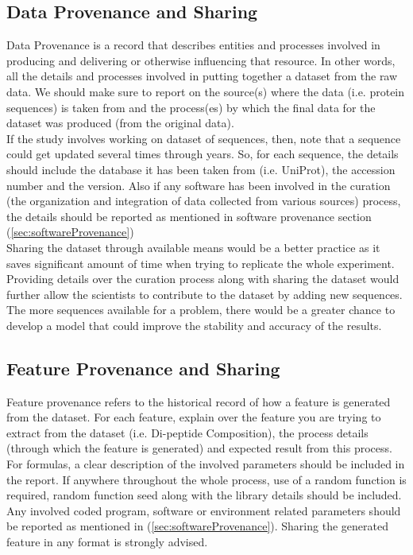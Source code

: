 \subsection{Data Provenance and Sharing}


    Data Provenance is a record that describes entities and processes involved in producing and delivering or otherwise influencing 
    that resource.\cite{w3c}  In other words, all the details and processes involved in putting together a dataset from the raw data. 
    We should make sure to report on the source(s) where the data (i.e. protein sequences) is taken from and the process(es) 
    by which the final data for the dataset was produced (from the original data). \\
    
    If the study involves working on dataset of sequences, then, note that a sequence could get updated several times through years. 
    So, for each sequence, the details should include the database it has been taken from (i.e. UniProt), 
    the accession number and the version. Also if any software has been involved in the curation
    (the organization and integration of data collected from various sources) process, 
    the details should be reported as mentioned in software provenance section (\ref{sec:softwareProvenance})\\
    
    
    Sharing the dataset through available means would be a better practice as it saves significant amount of time when
    trying to replicate the whole experiment.
    Providing details over the curation process along with sharing the dataset would further allow the scientists to contribute to the 
    dataset by adding new sequences. The more sequences available for a problem, there would be a greater chance to develop a model 
    that could improve the stability and accuracy of the results.
    
\subsection{Feature Provenance and Sharing}

    Feature provenance refers to the historical record of how a feature is generated from the dataset. For each feature, explain 
    over the feature you are trying to extract from the dataset (i.e. Di-peptide Composition), the process details (through which the 
    feature is generated) and expected result from this process. For formulas, a clear description of the involved parameters should be 
    included in the report. If anywhere throughout the whole process, use of a random function is required, random function seed along 
    with the library details should be included. 
    Any involved coded program, software or environment related parameters should be reported as mentioned in 
    (\ref{sec:softwareProvenance}). Sharing the generated feature in any format is strongly advised.\\
    
